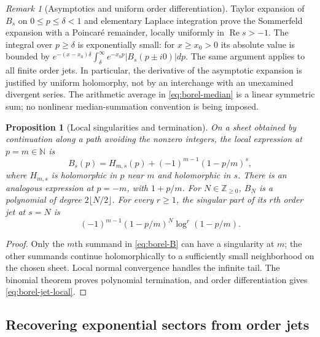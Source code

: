 \documentclass[11pt,a4paper]{article}
\numberwithin{equation}{section}
\newtheorem{proposition}[theorem]{Proposition}
\theoremstyle{definition}
\theoremstyle{remark}
\newtheorem{remark}[theorem]{Remark}
\begin{document}
\begin{remark}[Asymptotics and uniform order differentiation]
\label{rem:borel-watson}
Taylor expansion of $B_s$ on $0\leq p\leq\delta<1$ and elementary
Laplace integration prove the Sommerfeld expansion with a Poincar\'e
remainder, locally uniformly in $\operatorname{Re}s>-1$. The integral
over $p\geq\delta$ is exponentially small: for $x\geq x_0>0$ its absolute
value is bounded by
$e^{-(x-x_0)\delta}\int_\delta^\infty e^{-x_0p}|B_s(p\pm i0)|dp$.
The same argument applies to all finite order jets. In particular, the
derivative of the asymptotic expansion is justified by uniform
holomorphy, not by an interchange with an unexamined divergent series.
The arithmetic average in \eqref{eq:borel-median} is a linear symmetric
sum; no nonlinear median-summation convention is being imposed.
\end{remark}

\begin{proposition}[Local singularities and termination]
\label{prop:borel-local}
On a sheet obtained by continuation along a path avoiding the nonzero
integers, the local expression at $p=m\in\mathbb N$ is
\begin{equation}\label{eq:borel-local-sing}
 B_s(p)=H_{m,s}(p)+(-1)^{m-1}(1-p/m)^s,
\end{equation}
where $H_{m,s}$ is holomorphic in $p$ near $m$ and holomorphic in $s$.
There is an analogous expression at $p=-m$, with $1+p/m$.
For $N\in\mathbb Z_{\geq0}$, $B_N$ is a polynomial of degree
$2\lfloor N/2\rfloor$. For every $r\geq1$, the singular part of its
$r$th order jet at $s=N$ is
\begin{equation}\label{eq:borel-jet-local}
 (-1)^{m-1}(1-p/m)^N\log^r(1-p/m).
\end{equation}
\end{proposition}

\begin{proof}
Only the $m$th summand in \eqref{eq:borel-B} can have a singularity at
$m$; the other summands continue holomorphically to a sufficiently small
neighborhood on the chosen sheet. Local normal convergence handles the
infinite tail. The binomial theorem proves polynomial termination, and
order differentiation gives \eqref{eq:borel-jet-local}.
\end{proof}

\subsection{Recovering exponential sectors from order jets}
\end{document}
